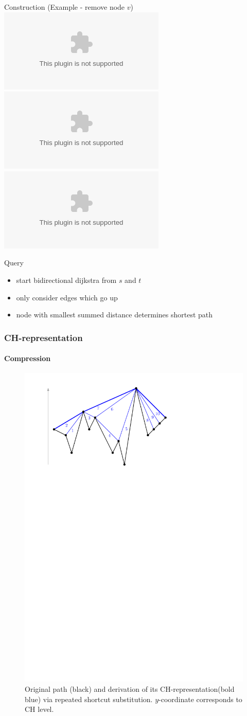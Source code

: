 \documentclass[10pt, t,
aspectratio=169,%
]{beamer}
\newcommand{\chrep}{CH-representation\xspace}
\begin{document}
\begin{frame}{Construction (Example - remove node $v$)}
	\centering
	\includegraphics<2>[keepaspectratio,height=.8\textheight,width=.8\textwidth]{graphics/ch_constr/ch_constr_1.eps}%
	\includegraphics<3>[keepaspectratio,height=.8\textheight,width=.8\textwidth]{graphics/ch_constr/ch_constr_2.eps}%
	\includegraphics<4>[keepaspectratio,height=.8\textheight,width=.8\textwidth]{graphics/ch_constr/ch_constr_3.eps}%
\end{frame}

\begin{frame}{Query}
	\begin{itemize}[<+(1)->]
		\item start bidirectional dijkstra from $s$ and $t$
		\item only consider edges which go up
		\item node with smallest summed distance determines shortest path
	\end{itemize}
\end{frame}

\begin{frame}
	\frametitle{\chrep}
	\framesubtitle{Compression}
	\begin{figure}
		\caption{Original path (black) and derivation of its \chrep (bold blue) via repeated shortcut substitution. $y$-coordinate corresponds to CH level.}
		\includegraphics[width=.76\columnwidth]{images/toch}
	\end{figure}
\end{frame}
\end{document}
